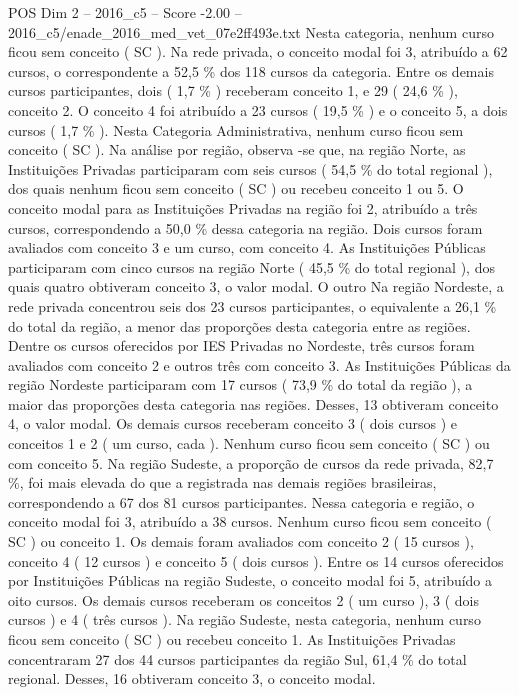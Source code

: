 \begin{textsample}{POS Dim 2 – 2016\_c5 – Score -2.00 – 2016\_c5/enade\_2016\_med\_vet\_07e2ff493e.txt}
Nesta categoria, nenhum curso ficou sem conceito ( SC ).
Na rede privada, o conceito modal foi 3, atribuído a 62 cursos, o correspondente a 52,5 \% dos 118 cursos da categoria.
Entre os demais cursos participantes, dois ( 1,7 \% ) receberam conceito 1, e 29 ( 24,6 \% ), conceito 2.
O conceito 4 foi atribuído a 23 cursos ( 19,5 \% ) e o conceito 5, a dois cursos ( 1,7 \% ).
Nesta Categoria Administrativa, nenhum curso ficou sem conceito ( SC ).
Na análise por região, observa -se que, na região Norte, as Instituições Privadas participaram com seis cursos ( 54,5 \% do total regional ), dos quais nenhum ficou sem conceito ( SC ) ou recebeu conceito 1 ou 5.
O conceito modal para as Instituições Privadas na região foi 2, atribuído a três cursos, correspondendo a 50,0 \% dessa categoria na região.
Dois cursos foram avaliados com conceito 3 e um curso, com conceito 4.
As Instituições Públicas participaram com cinco cursos na região Norte ( 45,5 \% do total regional ), dos quais quatro obtiveram conceito 3, o valor modal.
O outro Na região Nordeste, a rede privada concentrou seis dos 23 cursos participantes, o equivalente a 26,1 \% do total da região, a menor das proporções desta categoria entre as regiões.
Dentre os cursos oferecidos por IES Privadas no Nordeste, três cursos foram avaliados com conceito 2 e outros três com conceito 3.
As Instituições Públicas da região Nordeste participaram com 17 cursos ( 73,9 \% do total da região ), a maior das proporções desta categoria nas regiões.
Desses, 13 obtiveram conceito 4, o valor modal.
Os demais cursos receberam conceito 3 ( dois cursos ) e conceitos 1 e 2 ( um curso, cada ).
Nenhum curso ficou sem conceito ( SC ) ou com conceito 5.
Na região Sudeste, a proporção de cursos da rede privada, 82,7 \%, foi mais elevada do que a registrada nas demais regiões brasileiras, correspondendo a 67 dos 81 cursos participantes.
Nessa categoria e região, o conceito modal foi 3, atribuído a 38 cursos.
Nenhum curso ficou sem conceito ( SC ) ou conceito 1.
Os demais foram avaliados com conceito 2 ( 15 cursos ), conceito 4 ( 12 cursos ) e conceito 5 ( dois cursos ).
Entre os 14 cursos oferecidos por Instituições Públicas na região Sudeste, o conceito modal foi 5, atribuído a oito cursos.
Os demais cursos receberam os conceitos 2 ( um curso ), 3 ( dois cursos ) e 4 ( três cursos ).
Na região Sudeste, nesta categoria, nenhum curso ficou sem conceito ( SC ) ou recebeu conceito 1.
As Instituições Privadas concentraram 27 dos 44 cursos participantes da região Sul, 61,4 \% do total regional.
Desses, 16 obtiveram conceito 3, o conceito modal.

\end{textsample}
